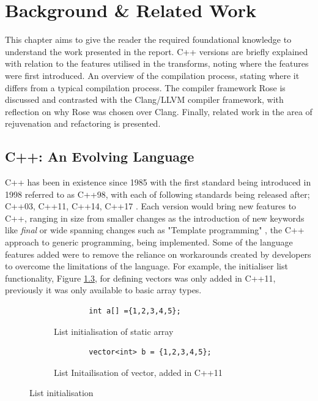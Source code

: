 \documentclass[bsc,frontabs,singlespacing,twoside,parskip,deptreport]{infthesis}
\begin{document}

\chapter{Background \& Related Work}

This chapter aims to give the reader the required foundational knowledge to understand the work presented in the report. C++ versions are briefly explained with relation to the features utilised in the transforms, noting where the features were first introduced. An overview of the compilation process, stating where it differs from a typical compilation process. The compiler framework Rose is discussed and contrasted with the Clang/LLVM compiler framework, with reflection on why Rose was chosen over Clang. Finally, related work in the area of rejuvenation and refactoring is presented. 

\section{C++: An Evolving Language}\label{sec:cpp-background}
C++ has been in existence since 1985 with the first standard being introduced in 1998 referred to as C++98, with each of following standards being released after; C++03, C++11, C++14, C++17 \cite{CPP_VER}. Each version would bring new features to C++, ranging in size from smaller changes as the introduction of new keywords like \textit{final} or wide spanning changes such as "Template programming" \cite{TEMP_CPP}, the C++ approach to generic programming, being implemented. Some of the language features added were to remove the reliance on workarounds \cite{WORKARROUND_CPP} created by developers to overcome the limitations of the language. For example, the initialiser list functionality, Figure \ref{fig:vec-list}, for defining vectors was only added in C++11, previously it was only available to basic array types. 

\begin{figure}[H]
    \centering
    \begin{subfigure}[b]{0.5\textwidth}
        \begin{verbatim}
        int a[] ={1,2,3,4,5};
        \end{verbatim}
        \caption{List initialisation of static array}
        \vspace{0.2cm}
        \label{fig:vec-list-a}
    \end{subfigure}
    
    \begin{subfigure}[b]{0.5\textwidth}
        \begin{verbatim}
        vector<int> b = {1,2,3,4,5};
        \end{verbatim}
        \caption{List Initailisation of vector, added in C++11}
        \label{fig:vec-list-b}
    \end{subfigure}
    
    \caption{List initialisation}
    \label{fig:vec-list}
\end{figure}
\end{document}
